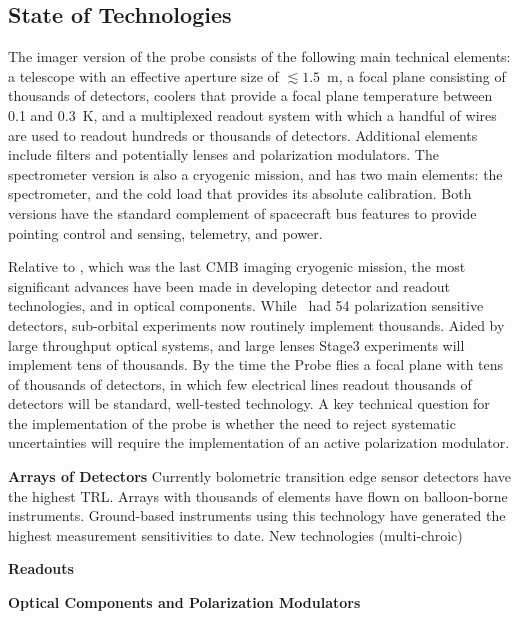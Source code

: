 
\subsection{State of Technologies}
\label{sec:technologies}

\vspace{-0.05in}

The imager version of the probe consists of the following main technical elements: a telescope with an effective aperture size 
of $\lesssim1.5$~m, a focal plane consisting of thousands of detectors, coolers that provide a focal plane temperature between 0.1 and 0.3~K, 
and a multiplexed readout system with which a handful of wires are used to readout hundreds or thousands of detectors. Additional 
elements include filters and potentially lenses and polarization modulators. 
The spectrometer version is also a cryogenic mission, and has two main elements: the spectrometer, and the cold load that provides its
absolute calibration. Both versions have the standard complement of spacecraft bus features to provide pointing control 
and sensing, telemetry, and power. 

Relative to \planck , which was the last CMB imaging cryogenic mission, the most significant advances have been made in 
developing detector and readout technologies, and in optical components. While \planck\ had 54 polarization 
sensitive detectors, sub-orbital experiments now routinely implement thousands. Aided by large throughput optical 
systems, and large lenses Stage3 experiments will implement
tens of thousands. By the time the Probe flies a focal plane with tens of thousands 
of detectors, in which few electrical lines readout thousands of detectors will be standard, well-tested technology. 
A key technical question for the implementation of the probe is whether the need to reject systematic uncertainties 
will require the implementation of an active polarization modulator. 

{\bf Arrays of Detectors} \hspace{0.1in} Currently bolometric transition edge sensor detectors have the highest TRL. Arrays
with thousands of elements have flown on balloon-borne instruments. Ground-based instruments using this 
technology have generated the highest measurement sensitivities to date. New technologies (multi-chroic)



{\bf Readouts}

{\bf Optical Components and Polarization Modulators}



